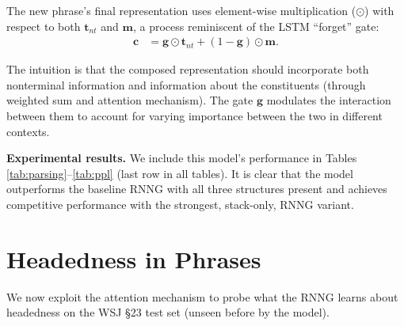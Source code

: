 \documentclass[11pt]{article}
\newcommand{\ignore}[1]{}
\newcommand{\ask}[1]{\textcolor{orange}{{\textbf{[#1 --\textsc{ask}]}}}}
\newcommand{\nascomment}[1]{\textcolor{blue}{{\textbf{[#1 --\textsc{nas}]}}}}
\renewcommand{\ask}[1]{}
\renewcommand{\nascomment}[1]{}
\begin{document}
The new phrase's final representation uses element-wise multiplication ($\odot$) with respect to both $\mathbf{t}_{\mathit{nt}}$ and $\mathbf{m}$, a process reminiscent of the LSTM ``forget'' gate:
\begin{align}
\mathbf{c} &= \mathbf{g} \odot \mathbf{t}_{\mathit{nt}} + \left( 1 -  \mathbf{g}\right) \odot \mathbf{m}.
\end{align}

The intuition is that the composed representation should incorporate both nonterminal information and information about the constituents (through weighted sum and attention mechanism). The gate $\mathbf{g}$ modulates the interaction between them to account for varying importance between the two in different contexts.  %
\ignore{\ask{add figure here. Or not, if the equations and intuitions are clear enough; I tried making it as clear as possible since some reviewers may not be familiar with attention (mostly used in MT). Any thoughts?}. \nascomment{I don't think we need a figure.  I tried to make it even cleaner; please check carefully.  I got rid of some symbols.}}


\textbf{Experimental results.} We include this model's performance in Tables \ref{tab:parsing}--\ref{tab:ppl} (last row in all tables). It is clear that the model outperforms the baseline RNNG with all three structures present and achieves competitive performance with the strongest, stack-only, RNNG variant.


\section{Headedness in Phrases}\label{sec:headedness}
We now exploit the attention mechanism to probe what the RNNG learns about headedness on the WSJ \S 23 test set (unseen before by the model).
\end{document}
